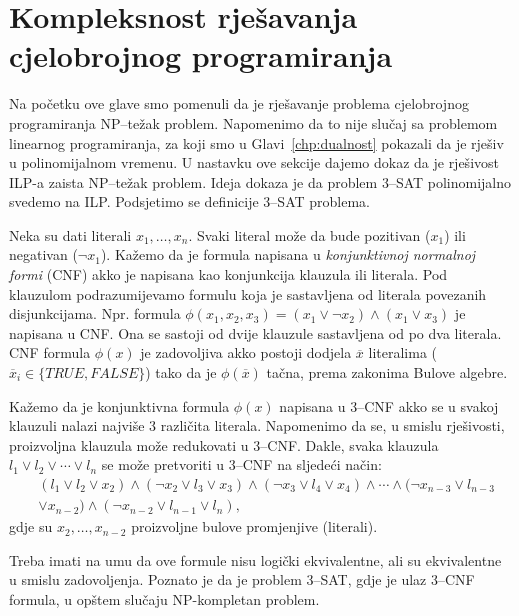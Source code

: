 \documentclass[a4paper, utf8, 11pt, colorlinks]{book}
\theoremstyle{definition}
\begin{document}
 \section{Kompleksnost rješavanja cjelobrojnog programiranja}\label{sec:kompleksnostILP}
   
   Na početku ove glave smo pomenuli da je rješavanje problema cjelobrojnog programiranja NP--težak problem. Napomenimo da to nije slučaj sa problemom linearnog programiranja, za koji smo u Glavi~\ref{chp:dualnost} pokazali da je rješiv u polinomijalnom vremenu. U nastavku ove sekcije dajemo dokaz da je rješivost ILP-a zaista NP--težak problem. Ideja dokaza je da problem 3--SAT  polinomijalno svedemo na ILP.
   Podsjetimo se definicije 3--SAT problema. 
   
   Neka su dati literali $x_1, \ldots, x_n$. Svaki literal može da bude pozitivan ($x_1$) ili negativan  ($\neg x_1$). Kažemo da je formula napisana u \emph{konjunktivnoj normalnoj formi} (CNF) akko je napisana kao konjunkcija klauzula ili literala. Pod klauzulom podrazumijevamo formulu koja je sastavljena od literala povezanih disjunkcijama. Npr. formula $\phi(x_1, x_2, x_3)= (x_1 \vee  \neg x_2) \wedge (x_1 \vee x_3)$ je napisana u CNF. Ona se sastoji od dvije klauzule sastavljena od po dva literala. CNF formula $\phi(x)$ je zadovoljiva akko postoji dodjela $\overline{x}$ literalima ($\overline{x}_i \in \{TRUE, FALSE\}$) tako da je $\phi(\overline{x})$ tačna, prema zakonima Bulove algebre.  
   

   Kažemo da je konjunktivna formula $\phi(x)$  napisana u 3--CNF  akko se u svakoj klauzuli nalazi najviše 3 različita literala. Napomenimo da se, u smislu rješivosti, proizvoljna klauzula može redukovati u 3--CNF. Dakle, svaka klauzula 
   $l_1 \vee l_2 \vee \cdots \vee l_n$ se može pretvoriti u 3--CNF na sljedeći način:
   \begin{align*}
       &(l_1 \vee l_2 \vee x_2) \wedge ( \neg x_2 \vee l_3 \vee x_3) \wedge ( \neg x_3 \vee l_4 \vee x_4 ) \wedge \cdots \wedge (\neg x_{n-3} \vee l_{n-3} \\
       &\vee x_{n-2} ) \wedge ( \neg x_{n-2} \vee l_{n-1} \vee l_n ),  
    \end{align*}    
gdje su $x_2, \ldots, x_{n-2}$  proizvoljne bulove promjenjive (literali).  
 
 Treba imati na umu da ove formule nisu logički ekvivalentne, ali su ekvivalentne u smislu zadovoljenja. 
    Poznato je da je problem 3--SAT, gdje je ulaz 3--CNF formula,  u opštem slučaju NP-kompletan problem.  
    
\end{document}
